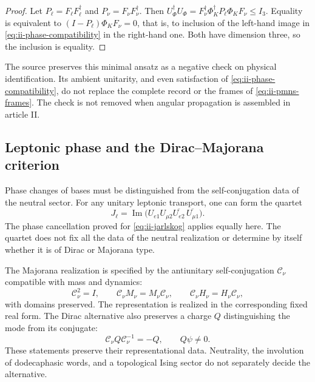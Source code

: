 \begin{proof}
Let \(P_\ell=F_\ell F_\ell^\dagger\) and
\(P_\nu=F_\nu F_\nu^\dagger\). Then
\(U_\Phi^\dagger U_\Phi
=F_\nu^\dagger\Phi_K^\dagger P_\ell\Phi_KF_\nu\le I_3\).
Equality is equivalent to
\((I-P_\ell)\Phi_KF_\nu=0\), that is, to inclusion of the
left-hand image in \eqref{eq:ii-phase-compatibility} in the right-hand one.
Both have dimension three, so the inclusion is equality.
\end{proof}

The source \cite{mezcla} preserves this minimal ansatz as a negative
check on physical identification. Its ambient unitarity, and even
satisfaction of \eqref{eq:ii-phase-compatibility}, do not replace the
complete record or the frames of \eqref{eq:ii-pmns-frames}. The
check is not removed when angular propagation is assembled in article II.

\subsection{Leptonic phase and the Dirac--Majorana criterion}

Phase changes of bases must be distinguished from the self-conjugation
data of the neutral sector. For any unitary leptonic
transport, one can form the quartet
\begin{equation}
 J_\ell=\operatorname{Im}
 \bigl(U_{e1}U_{\mu2}\overline{U_{e2}}\,
                        \overline{U_{\mu1}}\bigr).
 \label{eq:ii-leptonic-quartet}
\end{equation}
The phase cancellation proved for \eqref{eq:ii-jarlskog}
applies equally here. The quartet does not fix all the data of the
neutral realization or determine by itself whether it is of Dirac or Majorana type.

The Majorana realization is specified by the
antiunitary self-conjugation \(\mathcal C_\nu\) compatible with mass and
dynamics:
\begin{equation}
 \mathcal C_\nu^2=I,\qquad
 \mathcal C_\nu M_\nu=M_\nu\mathcal C_\nu,\qquad
 \mathcal C_\nu H_\nu=H_\nu\mathcal C_\nu,
 \label{eq:ii-majorana-compatibility}
\end{equation}
with domains preserved. The representation is realized in the corresponding
fixed real form. The Dirac alternative also preserves a charge
\(Q\) distinguishing the mode from its conjugate:
\begin{equation}
 \mathcal C_\nu Q\mathcal C_\nu^{-1}=-Q,\qquad Q\psi\ne0.
 \label{eq:ii-dirac-charge}
\end{equation}
These statements preserve their representational data. Neutrality,
the involution of dodecaphasic words, and a topological Ising sector
do not separately decide the alternative.

